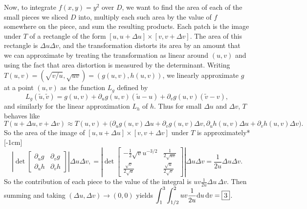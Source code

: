 \documentclass[prettycode,shellescape]{watsonbook}
\begin{document}
\begin{solution}
  Now, to integrate $f(x,y) = y^2$ over $D$, we want to find the area
  of each of the small pieces we sliced $D$ into, multiply each such
  area by the value of $f$ somewhere on the piece, and sum the
  resulting products. Each patch is the image under $T$ of a rectangle
  of the form $[u, u+\Delta u] \times [v, v + \Delta v]$. The area of
  this rectangle is $\Delta u \Delta v$, and the transformation
  distorts its area by an amount that we can approximate by treating
  the transformation as linear around $(u,v)$ and using the fact that
  area distortion is measured by the determinant. Writing
  $T(u,v) = (\sqrt{v/u}, \sqrt{uv}) = (g(u,v), h(u,v))$, we linearly
  approximate $g$ at a point $(u,v)$ as the function $L_g$ defined by
  \[
    L_g(\widetilde{u},\widetilde{v}) = g(u,v) + \partial_ug(u,v)(\widetilde{u} -
    u)+ \partial_vg(u,v)(\widetilde{v} -v), 
  \]
  and similarly for the linear approximation $L_h$ of $h$. Thus for
  small $\Delta u$ and $\Delta v$, $T$ behaves like  
  \begin{equation} \label{eq:Tuv} 
    T(u + \Delta u, v + \Delta v) \approx T(u,v) + \big( \partial_ug(u,v)
    \Delta u + \partial_v g(u,v) \Delta v, \partial_uh(u,v)
    \Delta u + \partial_v h(u,v) \Delta v \big). 
  \end{equation}
  So the area of the image of
  $[u, u+\Delta u] \times [v, v + \Delta v]$ under $T$ is
  approximately* [-1cm]
  \[
    \left| \det \left[
        \begin{array}{cc}
          \partial_u g & \partial _v g\\
          \partial_u h & \partial _v h 
        \end{array} \right]
    \right|\Delta u \Delta v,  =
    \left| \det \left[
        \begin{array}{cc}
          -\frac{1}{2}\sqrt{v}u^{-3/2} & \frac{1}{2\sqrt{uv}} \\
          \frac{\sqrt{v}}{2\sqrt{u}} & \frac{\sqrt{u}}{2\sqrt{v}}
        \end{array} \right]
    \right| \Delta u \Delta v  = \frac{1}{2u}
    \Delta u \Delta v. 
  \]
  So the contribution of each piece to the value of the integral is
  $uv \frac{1}{2u} \Delta u \, {\Delta}v$. Then summing and taking
  $(\Delta u, \Delta v) \to (0,0)$ yields
  $\displaystyle{\int_{1}^{3}\int_{1/2}^{2}uv \frac{1}{2u} \mathrm{d}u \,
    {\mathrm{d}}v = \boxed{3}}$.
\end{solution}
\end{document}
